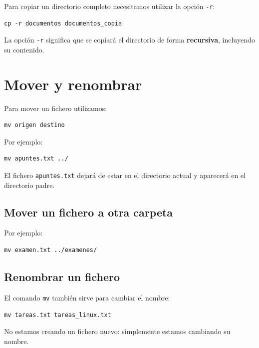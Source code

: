 \documentclass[11pt,a4paper]{article}
\begin{document}
Para copiar un directorio completo necesitamos utilizar la opción \texttt{-r}:


\begin{lstlisting}
cp -r documentos documentos_copia
\end{lstlisting}


\noindent La opción \texttt{-r} significa que se copiará el directorio de forma \textbf{recursiva}, incluyendo su contenido.


\section{Mover y renombrar}


Para mover un fichero utilizamos:


\begin{lstlisting}
mv origen destino
\end{lstlisting}


\noindent Por ejemplo:


\begin{lstlisting}
mv apuntes.txt ../
\end{lstlisting}


\noindent El fichero \texttt{apuntes.txt} dejará de estar en el directorio actual y aparecerá en el directorio padre.


\subsection{Mover un fichero a otra carpeta}


Por ejemplo:


\begin{lstlisting}
mv examen.txt ../examenes/
\end{lstlisting}


\subsection{Renombrar un fichero}


El comando \texttt{mv} también sirve para cambiar el nombre:


\begin{lstlisting}
mv tareas.txt tareas_linux.txt
\end{lstlisting}


\noindent No estamos creando un fichero nuevo: simplemente estamos cambiando su nombre.
\end{document}

